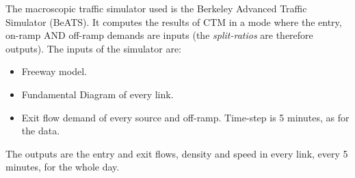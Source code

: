 The macroscopic traffic simulator used is the Berkeley Advanced Traffic Simulator (BeATS). It computes the results of CTM in a mode where the entry, on-ramp AND off-ramp demands are inputs (the \emph{split-ratios} are therefore outputs).
The inputs of the simulator are:
\begin{itemize}
	\item Freeway model.
	\item Fundamental Diagram of every link.
	\item Exit flow demand of every source and off-ramp. Time-step is 5 minutes, as for the data.
\end{itemize}
The outputs are the entry and exit flows, density and speed in every link, every 5 minutes, for the whole day.
